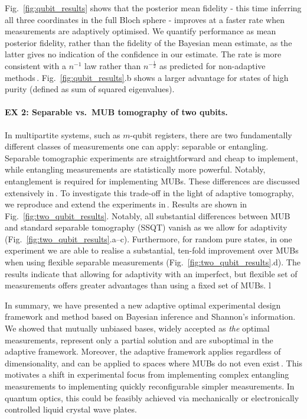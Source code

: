 Fig.\ \ref{fig:qubit_results} shows that the posterior mean fidelity - this time inferring all three coordinates in the full Bloch sphere - improves at a faster rate when measurements are adaptively optimised. We quantify performance as mean posterior fidelity, rather than the fidelity of the Bayesian mean estimate, as the latter gives no indication of the confidence in our estimate. The rate is more consistent with a $n^{-1}$ law rather than $n^{-\frac{1}{2}}$ as predicted for non-adaptive methods\,\cite[][and refs.]{MUBExperiment}. Fig.\ \ref{fig:qubit_results}.b shows a larger advantage for states of high purity (defined as sum of squared eigenvalues).

\paragraph{EX 2: Separable vs.\ MUB tomography of two qubits.} In multipartite systems, such as $m$-qubit registers, there are two fundamentally different classes of measurements one can apply: separable or entangling. Separable tomographic experiments are straightforward and cheap to implement, while entangling measurements are statistically more powerful. Notably, entanglement is required for implementing MUBs. These differences are discussed extensively in\,\citep{MUBExperiment}. To investigate this trade-off in the light of adaptive tomography, we reproduce and extend the experiments in\,\citep{MUBExperiment}. Results are shown in Fig.\ \ref{fig:two_qubit_results}. Notably, all substantial differences between MUB and standard separable tomography (SSQT) vanish as we allow for adaptivity (Fig.\ \ref{fig:two_qubit_results}.a--c). Furthermore, for random pure states, in one experiment we are able to realise a substantial, ten-fold improvement over MUBs when using flexible separable measurements (Fig.\ \ref{fig:two_qubit_results}.d). The results indicate that allowing for adaptivity with an imperfect, but flexible set of measurements offers greater advantages than using a fixed set of MUBs.
l

In summary, we have presented a new adaptive optimal experimental design framework and method based on Bayesian inference and Shannon's information. We showed that mutually unbiased bases, widely accepted as \emph{the} optimal measurements, represent only a partial solution and are suboptimal in the adaptive framework. Moreover, the adaptive framework applies regardless of dimensionality, and can be applied to spaces where MUBs do not even exist\,\citep{DimensionSix,ExactInformation}. This motivates a shift in experimental focus from implementing complex entangling measurements to implementing quickly reconfigurable simpler measurements. In quantum optics, this could be feasibly achieved via mechanically or electronically controlled liquid crystal wave plates.

